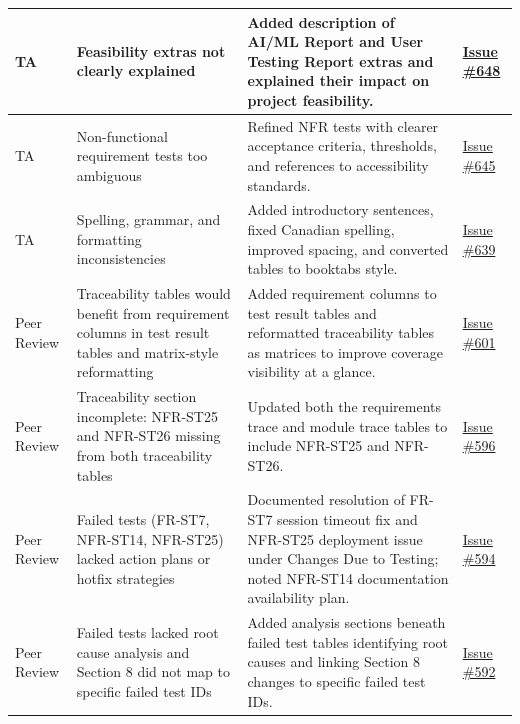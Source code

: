\documentclass{article}
\begin{document}
\begin{longtable}{|p{2cm}|p{3.5cm}|p{4.5cm}|p{3cm}|}
TA & Feasibility extras not clearly explained & Added description of AI/ML Report and User Testing Report extras and explained their impact on project feasibility. & \href{https://github.com/4G06-CAPSTONE-2025/Reading4All/issues/648}{Issue \#648} \\ \hline

TA & Non-functional requirement tests too ambiguous & Refined NFR tests with clearer acceptance criteria, thresholds, and references to accessibility standards. & \href{https://github.com/4G06-CAPSTONE-2025/Reading4All/issues/645}{Issue \#645} \\ \hline

TA & Spelling, grammar, and formatting inconsistencies & Added introductory sentences, fixed Canadian spelling, improved spacing, and converted tables to booktabs style. & \href{https://github.com/4G06-CAPSTONE-2025/Reading4All/issues/639}{Issue \#639} \\ \hline

Peer Review & Traceability tables would benefit from requirement columns in test result tables and matrix-style reformatting & Added requirement columns to test result tables and reformatted traceability tables as matrices to improve coverage visibility at a glance. & \href{https://github.com/4G06-CAPSTONE-2025/Reading4All/issues/601}{Issue \#601} \\ \hline

Peer Review & Traceability section incomplete: NFR-ST25 and NFR-ST26 missing from both traceability tables & Updated both the requirements trace and module trace tables to include NFR-ST25 and NFR-ST26. & \href{https://github.com/4G06-CAPSTONE-2025/Reading4All/issues/596}{Issue \#596} \\ \hline

Peer Review & Failed tests (FR-ST7, NFR-ST14, NFR-ST25) lacked action plans or hotfix strategies & Documented resolution of FR-ST7 session timeout fix and NFR-ST25 deployment issue under Changes Due to Testing; noted NFR-ST14 documentation availability plan. & \href{https://github.com/4G06-CAPSTONE-2025/Reading4All/issues/594}{Issue \#594} \\ \hline

Peer Review & Failed tests lacked root cause analysis and Section 8 did not map to specific failed test IDs & Added analysis sections beneath failed test tables identifying root causes and linking Section 8 changes to specific failed test IDs. & \href{https://github.com/4G06-CAPSTONE-2025/Reading4All/issues/592}{Issue \#592} \\ \hline


\end{longtable}
\end{document}

